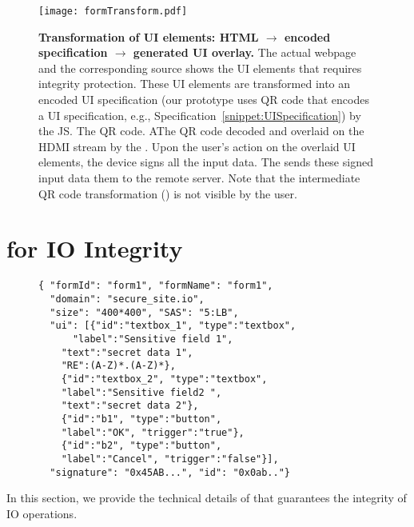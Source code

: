 \begin{figure*}[t]
\centering
\texttt{[image: formTransform.pdf]}
\caption{\textbf{Transformation of UI elements: HTML $\rightarrow$ encoded specification $\rightarrow$ \device generated UI overlay.} \one The actual webpage and the corresponding \html source shows the UI elements that requires integrity protection. \two These UI elements are transformed into an encoded UI specification (our \name prototype uses QR code that encodes a UI specification, e.g., Specification~\ref{snippet:UISpecification}) by the \name JS. The QR code. \three AThe QR code decoded and overlaid on the HDMI stream by the \device. \four Upon the user's action on the overlaid UI elements, the device signs all the input data. \five The \device sends these signed input data them to the remote server. Note that the intermediate QR code transformation (\two) is not visible by the user.}
\spacesave
\label{fig:transformation}
\end{figure*}

\section{\name for IO Integrity}
\label{sec:systemDesign}




\begin{figure}[t]
\scriptsize
\begin{lstlisting}[mathescape=true]
{ "formId": "form1", "formName": "form1",
  "domain": "secure_site.io",
  "size": "400*400", "SAS": "5:LB",
  "ui": [{"id":"textbox_1", "type":"textbox", 
      "label":"Sensitive field 1",
    "text":"secret data 1",
    "RE":(A-Z)*.(A-Z)*},
    {"id":"textbox_2", "type":"textbox",
    "label":"Sensitive field2 ",
    "text":"secret data 2"},
    {"id":"b1", "type":"button",
    "label":"OK", "trigger":"true"},    
    {"id":"b2", "type":"button",
    "label":"Cancel", "trigger":"false"}],
  "signature": "0x45AB...", "id": "0x0ab.."}
\end{lstlisting}
\spacesave
\end{figure}

In this section, we provide the technical details of \name that guarantees the integrity of IO operations.


